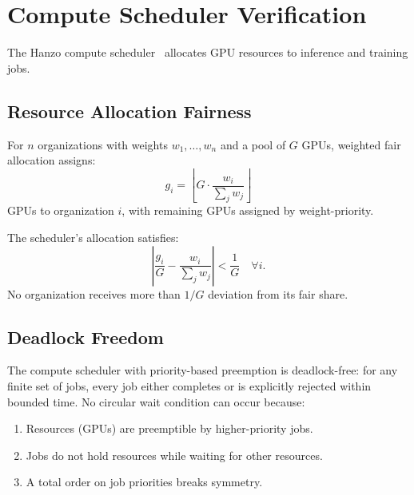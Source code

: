 \section{Compute Scheduler Verification}

\label{sec:compute}

The Hanzo compute scheduler~\cite{hanzoaci} allocates GPU resources to
inference and training jobs.

\subsection{Resource Allocation Fairness}

\begin{definition}
For $n$ organizations with weights $w_1, \ldots, w_n$ and a pool of $G$ GPUs,
weighted fair allocation assigns:
\begin{equation}
g_i = \left\lfloor G \cdot \frac{w_i}{\sum_j w_j} \right\rfloor
\end{equation}
GPUs to organization $i$, with remaining GPUs assigned by weight-priority.
\end{definition}

\begin{theorem}
The scheduler's allocation satisfies:
\begin{equation}
\left| \frac{g_i}{G} - \frac{w_i}{\sum_j w_j} \right| < \frac{1}{G}
\quad \forall i.
\end{equation}
No organization receives more than $1/G$ deviation from its fair share.
\end{theorem}

\subsection{Deadlock Freedom}

\begin{theorem}
The compute scheduler with priority-based preemption is deadlock-free: for
any finite set of jobs, every job either completes or is explicitly rejected
within bounded time. No circular wait condition can occur because:
\begin{enumerate}[leftmargin=1.4em]
    \item Resources (GPUs) are preemptible by higher-priority jobs.
    \item Jobs do not hold resources while waiting for other resources.
    \item A total order on job priorities breaks symmetry.
\end{enumerate}
\end{theorem}


